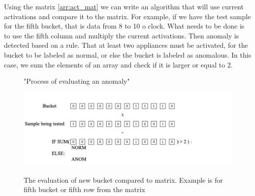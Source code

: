 Using the matrix \ref{arr:act_mat} we can write an algorithm that will use current activations 
and compare it to the matrix. For example, if we have the test sample for the fifth bucket, that is 
data from 8 to 10 o clock. 
What needs to be done is to use the fifth column and multiply the current activations.
Then anomaly is detected based on a rule. That at least two appliances must be activated, for the bucket to be labeled as normal,
or else the bucket is labeled as anomalous. In this case, we sum the elements of an array and check if it is larger or equal to 2. 

        

\begin{figure}[H]
    \centering
    \caption{"Process of evaluating an anomaly"}
    \includegraphics[width=1\linewidth]{../Figures/EC/EC_anom_dect.png}
    \label{fig:anom_detct}
    \caption{The evaluation of new bucket compared to matrix. Example is for fifth bucket or fifth row from the matrix}
    
\end{figure}

